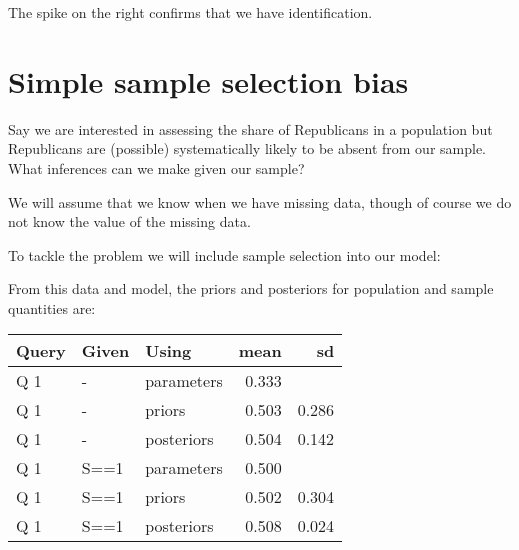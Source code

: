 \documentclass[
  12pt,
]{book}
\newenvironment{Shaded}{\begin{snugshade}}{\end{snugshade}}
\newcommand{\DataTypeTok}[1]{\textcolor[rgb]{0.13,0.29,0.53}{#1}}
\newcommand{\DecValTok}[1]{\textcolor[rgb]{0.00,0.00,0.81}{#1}}
\newcommand{\KeywordTok}[1]{\textcolor[rgb]{0.13,0.29,0.53}{\textbf{#1}}}
\newcommand{\NormalTok}[1]{#1}
\newcommand{\OperatorTok}[1]{\textcolor[rgb]{0.81,0.36,0.00}{\textbf{#1}}}
\newcommand{\OtherTok}[1]{\textcolor[rgb]{0.56,0.35,0.01}{#1}}
\newcommand{\StringTok}[1]{\textcolor[rgb]{0.31,0.60,0.02}{#1}}
\begin{document}
The spike on the right confirms that we have identification.

\hypertarget{simple-sample-selection-bias}{%
\section{Simple sample selection bias}\label{simple-sample-selection-bias}}

Say we are interested in assessing the share of Republicans in a population but Republicans are (possible) systematically likely to be absent from our sample. What inferences can we make given our sample?

We will assume that we know when we have missing data, though of course we do not know the value of the missing data.

To tackle the problem we will include sample selection into our model:

\begin{Shaded}
\end{Shaded}

From this data and model, the priors and posteriors for population and sample quantities are:

\begin{tabular}{l|l|l|r|r}
\hline
Query & Given & Using & mean & sd\\
\hline
Q 1 & - & parameters & 0.333 & \\
\hline
Q 1 & - & priors & 0.503 & 0.286\\
\hline
Q 1 & - & posteriors & 0.504 & 0.142\\
\hline
Q 1 & S==1 & parameters & 0.500 & \\
\hline
Q 1 & S==1 & priors & 0.502 & 0.304\\
\hline
Q 1 & S==1 & posteriors & 0.508 & 0.024\\
\hline
\end{tabular}
\end{document}
